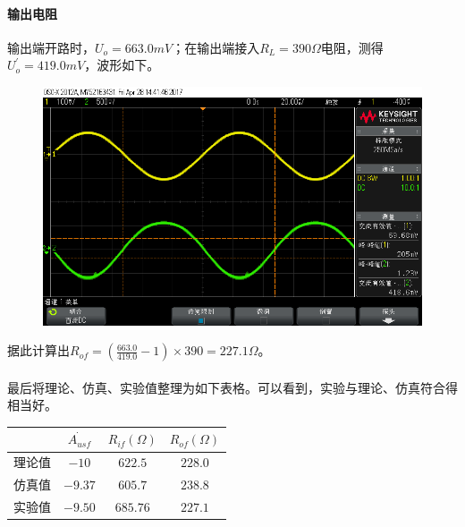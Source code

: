 \documentclass[12pt,a4paper]{article}
\begin{document}
\begin{spacing}{1.3}
\paragraph{输出电阻} 输出端开路时，$U_o=663.0mV$；在输出端接入$R_L=390\Omega$电阻，测得$U_{o}^{'}=419.0mV$，波形如下。
\begin{figure}[H]
\centering
\includegraphics[width=\textwidth]{scope_4.png}
\end{figure}
据此计算出$R_{of} = (\frac{663.0}{419.0}-1)\times 390 = 227.1\Omega$。\\\\
最后将理论、仿真、实验值整理为如下表格。可以看到，实验与理论、仿真符合得相当好。
\begin{table}[H]
\centering
\begin{tabular}{|c|c|c|c|}
\hline 
&$\dot{A_{usf}}$ &$R_{if}(\Omega)$ &$ R_{of}(\Omega)$ \\ \hline 
理论值 &$-10 $& $ 622.5$ &$228.0 $\\ \hline
仿真值&$ -9.37$& $605.7 $ &$238.8 $\\ \hline 
实验值&$ -9.50$& $685.76 $ &$227.1 $\\ \hline
\end{tabular} 
\end{table} 

\end{spacing}
\end{document}
